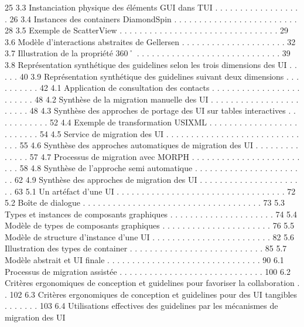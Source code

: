 \documentclass{article}
\begin{document}
25
3.3
Instanciation physique des \'{e}l\'{e}ments GUI dans TUI . . . . . . . . . . . . . . . . . .
26
3.4
Instances des containers DiamondSpin . . . . . . . . . . . . . . . . . . . . . . . . .
28
3.5
Exemple de ScatterView
. . . . . . . . . . . . . . . . . . . . . . . . . . . . . . . .
29
3.6
Mod\`{e}le d’interactions abstraites de Gellersen
. . . . . . . . . . . . . . . . . . . . .
32
3.7
Illustration de la propri\'{e}t\'{e} 360˚ . . . . . . . . . . . . . . . . . . . . . . . . . . . . .
39
3.8
Repr\'{e}sentation synth\'{e}tique des guidelines selon les trois dimensions des UI . . . . .
40
3.9
Repr\'{e}sentation synth\'{e}tique des guidelines suivant deux dimensions . . . . . . . . . .
42
4.1
Application de consultation des contacts . . . . . . . . . . . . . . . . . . . . . . . .
48
4.2
Synth\`{e}se de la migration manuelle des UI . . . . . . . . . . . . . . . . . . . . . . .
48
4.3
Synth\`{e}se des approches de portage des UI sur tables interactives . . . . . . . . . . .
52
4.4
Exemple de transformation USIXML
. . . . . . . . . . . . . . . . . . . . . . . . .
54
4.5
Service de migration des UI
. . . . . . . . . . . . . . . . . . . . . . . . . . . . . .
55
4.6
Synth\`{e}se des approches automatiques de migration des UI
. . . . . . . . . . . . . .
57
4.7
Processus de migration avec MORPH . . . . . . . . . . . . . . . . . . . . . . . . .
58
4.8
Synth\`{e}se de l’approche semi automatique
. . . . . . . . . . . . . . . . . . . . . . .
62
4.9
Synth\`{e}se des approches de migration des UI . . . . . . . . . . . . . . . . . . . . . .
63
5.1
Un art\'{e}fact d’une UI
. . . . . . . . . . . . . . . . . . . . . . . . . . . . . . . . . .
72
5.2
Bo\^{i}te de dialogue . . . . . . . . . . . . . . . . . . . . . . . . . . . . . . . . . . . .
73
5.3
Types et instances de composants graphiques
. . . . . . . . . . . . . . . . . . . . .
74
5.4
Mod\`{e}le de types de composants graphiques
. . . . . . . . . . . . . . . . . . . . . .
76
5.5
Mod\`{e}le de structure d’instance d’une UI . . . . . . . . . . . . . . . . . . . . . . . .
82
5.6
Illustration des types de container
. . . . . . . . . . . . . . . . . . . . . . . . . . .
85
5.7
Mod\`{e}le abstrait et UI ﬁnale . . . . . . . . . . . . . . . . . . . . . . . . . . . . . . .
90
6.1
Processus de migration assist\'{e}e . . . . . . . . . . . . . . . . . . . . . . . . . . . . .
100
6.2
Crit\`{e}res ergonomiques de conception et guidelines pour favoriser la collaboration . .
102
6.3
Crit\`{e}res ergonomiques de conception et guidelines pour des UI tangibles . . . . . . .
103
6.4
Utilisations effectives des guidelines par les m\'{e}canismes de migration des UI
\end{document}
